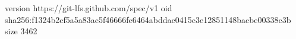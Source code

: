 version https://git-lfs.github.com/spec/v1
oid sha256:f1324b2cf5a5a83ac5f46666fe6464abddac0415c3e12851148bacbe00338c3b
size 3462
